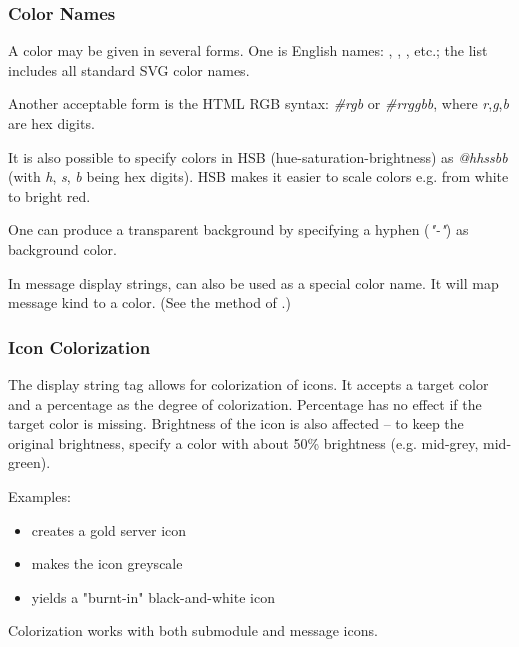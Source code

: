 \subsubsection{Color Names}
\label{sec:graphics:displaystring-color-names}

A color may be given in several forms. One is English names: ,
, , etc.; the list includes all standard SVG
color names.

Another acceptable form is the HTML RGB syntax: \textit{\#rgb} or
\textit{\#rrggbb}, where \textit{r},\textit{g},\textit{b} are hex digits.

It is also possible to specify colors in HSB (hue-saturation-brightness) as
\textit{@hhssbb} (with \textit{h}, \textit{s}, \textit{b} being hex digits).
HSB makes it easier to scale colors e.g. from white to bright red.

One can produce a transparent background by specifying a hyphen (\textit{"-"})
as background color.

In message display strings,  can also be used as a special color
name. It will map message kind to a color. (See the 
method of .)

\subsubsection{Icon Colorization}
\label{sec:graphics:displaystring-icon-colorization}

The  display string tag allows for colorization of icons.
It accepts a target color and a percentage as the degree of colorization.
Percentage has no effect if the target color is missing.
Brightness of the icon is also affected -- to keep the original brightness,
specify a color with about 50\% brightness (e.g.  mid-grey,
 mid-green).

Examples:

\begin{itemize}
  \item {} creates a gold server icon
  \item {} makes the icon greyscale
  \item {} yields a "burnt-in" black-and-white icon
\end{itemize}

Colorization works with both submodule and message icons.


